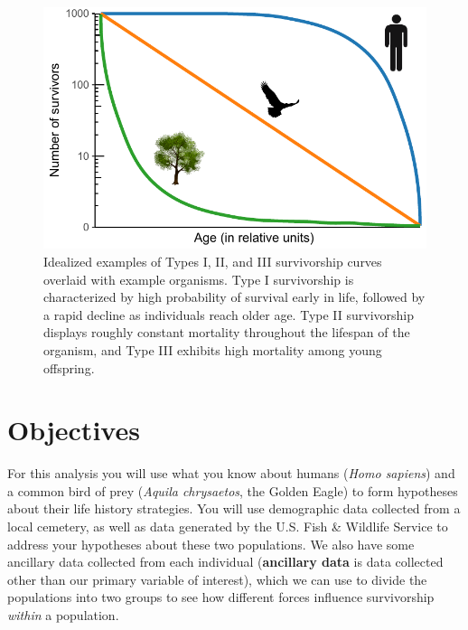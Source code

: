 \documentclass[11pt,]{article}
\begin{document}
\begin{figure}
\centering
\includegraphics{../_chapter_materials/base_plot.pdf}
\caption{Idealized examples of Types I, II, and III survivorship curves
overlaid with example organisms. Type I survivorship is characterized by
high probability of survival early in life, followed by a rapid decline
as individuals reach older age. Type II survivorship displays roughly
constant mortality throughout the lifespan of the organism, and Type III
exhibits high mortality among young offspring.}
\end{figure}

\hypertarget{objectives}{%
\section{Objectives}\label{objectives}}

For this analysis you will use what you know about humans (\emph{Homo
sapiens}) and a common bird of prey (\emph{Aquila chrysaetos}, the
Golden Eagle) to form hypotheses about their life history strategies.
You will use demographic data collected from a local cemetery, as well
as data generated by the U.S. Fish \& Wildlife Service to address your
hypotheses about these two populations. We also have some ancillary data
collected from each individual (\textbf{ancillary data} is data
collected other than our primary variable of interest), which we can use
to divide the populations into two groups to see how different forces
influence survivorship \emph{within} a population.
\end{document}
